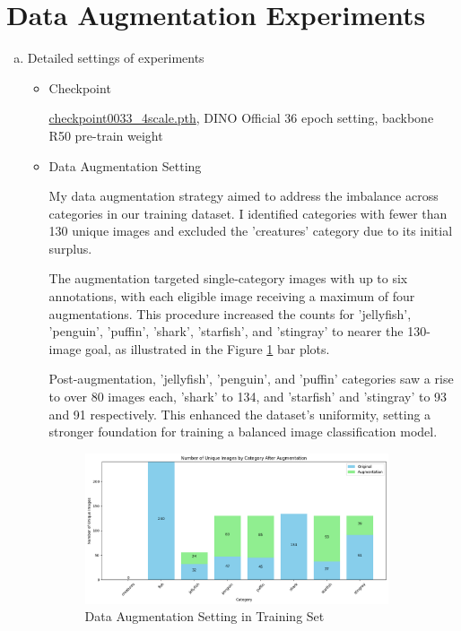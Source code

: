 \documentclass[10pt,a4paper]{article}
\begin{document}
\section*{Data Augmentation Experiments}
\begin{enumerate}[(a)]
\item Detailed settings of experiments
\begin{itemize}
\item Checkpoint

\href{https://drive.google.com/drive/folders/1qD5m1NmK0kjE5hh-G17XUX751WsEG-h_}{checkpoint0033\_4scale.pth}, DINO Official 36 epoch setting, backbone R50 pre-train weight

\item Data Augmentation Setting

My data augmentation strategy aimed to address the imbalance across categories in our training dataset. I identified categories with fewer than 130 unique images and excluded the 'creatures' category due to its initial surplus.

The augmentation targeted single-category images with up to six annotations, with each eligible image receiving a maximum of four augmentations. This procedure increased the counts for 'jellyfish', 'penguin', 'puffin', 'shark', 'starfish', and 'stingray' to nearer the 130-image goal, as illustrated in the Figure \ref{fig:TrainingSetBarPlot} bar plots.

Post-augmentation, 'jellyfish', 'penguin', and 'puffin' categories saw a rise to over 80 images each, 'shark' to 134, and 'starfish' and 'stingray' to 93 and 91 respectively. This enhanced the dataset's uniformity, setting a stronger foundation for training a balanced image classification model.


\begin{figure}[H]
\centering
\includegraphics[width=0.9\textwidth]{figure/data_augmentation_barplot.png}
\caption{Data Augmentation Setting in Training Set}
\label{fig:TrainingSetBarPlot}
\end{figure}


\end{itemize}
\end{enumerate}
\end{document}
